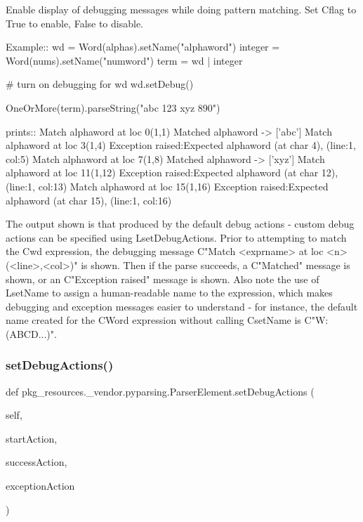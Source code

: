 \begin{DoxyVerb}Enable display of debugging messages while doing pattern matching.
Set C{flag} to True to enable, False to disable.

Example::
    wd = Word(alphas).setName("alphaword")
    integer = Word(nums).setName("numword")
    term = wd | integer
    
    # turn on debugging for wd
    wd.setDebug()

    OneOrMore(term).parseString("abc 123 xyz 890")

prints::
    Match alphaword at loc 0(1,1)
    Matched alphaword -> ['abc']
    Match alphaword at loc 3(1,4)
    Exception raised:Expected alphaword (at char 4), (line:1, col:5)
    Match alphaword at loc 7(1,8)
    Matched alphaword -> ['xyz']
    Match alphaword at loc 11(1,12)
    Exception raised:Expected alphaword (at char 12), (line:1, col:13)
    Match alphaword at loc 15(1,16)
    Exception raised:Expected alphaword (at char 15), (line:1, col:16)

The output shown is that produced by the default debug actions - custom debug actions can be
specified using L{setDebugActions}. Prior to attempting
to match the C{wd} expression, the debugging message C{"Match <exprname> at loc <n>(<line>,<col>)"}
is shown. Then if the parse succeeds, a C{"Matched"} message is shown, or an C{"Exception raised"}
message is shown. Also note the use of L{setName} to assign a human-readable name to the expression,
which makes debugging and exception messages easier to understand - for instance, the default
name created for the C{Word} expression without calling C{setName} is C{"W:(ABCD...)"}.
\end{DoxyVerb}
 \mbox{\label{classpkg__resources_1_1__vendor_1_1pyparsing_1_1ParserElement_ab5d54e826cc3f133346a2aed5f77a1dc}} 
\subsubsection{\texorpdfstring{set\+Debug\+Actions()}{setDebugActions()}}
{\footnotesize\ttfamily def pkg\+\_\+resources.\+\_\+vendor.\+pyparsing.\+Parser\+Element.\+set\+Debug\+Actions (\begin{DoxyParamCaption}\item[{}]{self,  }\item[{}]{start\+Action,  }\item[{}]{success\+Action,  }\item[{}]{exception\+Action }\end{DoxyParamCaption})}

